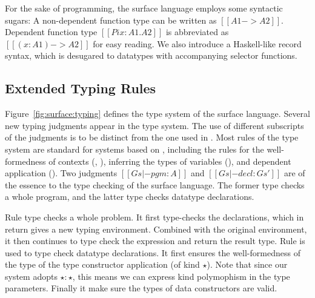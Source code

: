 For the sake of programming, the surface language employs some syntactic sugars: A non-dependent function type can be written as $[[A1 -> A2]]$. Dependent function type $[[Pi x : A1 . A2]]$ is abbreviated as $[[(x : A1) -> A2]]$ for easy reading. We also introduce a Haskell-like record syntax, which is desugared to datatypes with accompanying selector functions.


\subsection{Extended Typing Rules}

Figure~\ref{fig:surface:typing} defines the type system of the surface language. Several new typing judgments appear in the type system. The use of different subscripts of the judgments is to be distinct from the one used in \name. Most rules of the type system are standard for systems based on \coc, including the rules for the well-formedness of contexts (, ), inferring the types of variables (), and dependent application (). Two judgments $[[Gs |- pgm : A]]$ and $[[Gs |- decl : Gs']]$ are of the essence to the type checking of the surface language. The former type checks a whole program, and the latter type checks datatype declarations.

Rule  type checks a whole problem. It first type-checks the declarations, which in return gives a new typing environment. Combined with the original environment, it then continues to type check the expression and return the result type. Rule  is used to type check datatype declarations. It first ensures the well-formedness of the type of the type constructor application (of kind $\star$). Note that since our system adopts $\star : \star$, this means we can express kind polymophism in the type parameters. Finally it make sure the types of data constructors are valid.

